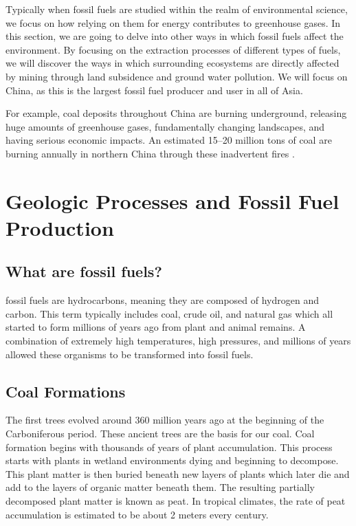 Typically when fossil fuels are studied within the realm of environmental science, we focus on how relying on them for energy contributes to greenhouse gases. In this section, we are going to delve into other ways in which fossil fuels affect the environment. By focusing on the extraction processes of different types of fuels, we will discover the ways in which surrounding ecosystems are directly affected by mining through land subsidence and ground water pollution. We will focus on China, as this is the largest fossil fuel producer and user in all of Asia. 

For example, coal deposits throughout China are burning underground, releasing huge amounts of greenhouse gases, fundamentally changing landscapes, and having serious economic impacts. An estimated 15--20 million tons of coal are burning annually in northern China through these inadvertent fires \citep{kuenzer2007uncontrolled}.



\section{Geologic Processes and Fossil Fuel Production}

\subsection{What are fossil fuels?}

\Gls{fossil fuels} are hydrocarbons, meaning they are composed of hydrogen and carbon. This term typically includes coal, crude oil, and natural gas which all started to form millions of years ago from plant and animal remains. A combination of extremely high temperatures, high pressures, and millions of years allowed these organisms to be transformed into fossil fuels. 

\subsection{Coal Formations}

The first trees evolved around 360 million years ago at the beginning of the Carboniferous period. These ancient trees are the basis for our coal. Coal formation begins with thousands of years of plant accumulation. This process starts with plants in wetland environments dying and beginning to decompose. 
This plant matter is then buried beneath new layers of plants which later die and add to the layers of organic matter beneath them. The resulting partially decomposed plant matter is known as \gls{peat}. In tropical climates, the rate of peat accumulation is estimated to be about 2 meters every century.

